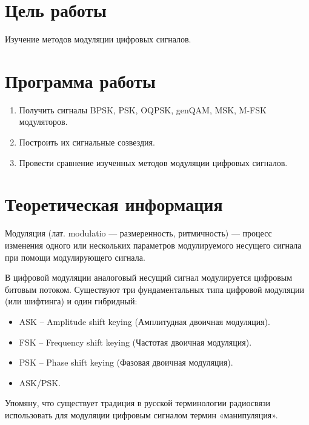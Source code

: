 
\usepackage{minted}




\setcounter{page}{2}



\section{Цель работы}
Изучение методов модуляции цифровых сигналов.

\section{Программа работы}
\begin{enumerate}
	\item Получить сигналы BPSK, PSK, OQPSK, genQAM, MSK, M-FSK модуляторов.
	\item Построить их сигнальные созвездия.
	\item Провести сравнение изученных методов модуляции цифровых сигналов.
	
\end{enumerate}

\section{Теоретическая информация}
Модуляция (лат. modulatio — размеренность, ритмичность) — процесс изменения одного или нескольких параметров модулируемого несущего сигнала при помощи модулирующего сигнала.

В цифровой модуляции аналоговый несущий сигнал модулируется цифровым битовым потоком.
Существуют три фундаментальных типа цифровой модуляции (или шифтинга) и один гибридный:
\begin{itemize}
	\item ASK – Amplitude shift keying (Амплитудная двоичная модуляция).
	\item FSK – Frequency shift keying (Частотая двоичная модуляция).
	\item PSK – Phase shift keying (Фазовая двоичная модуляция).
	\item ASK/PSK.
\end{itemize}

Упомяну, что существует традиция в русской терминологии радиосвязи использовать для модуляции цифровым сигналом термин «манипуляция».

